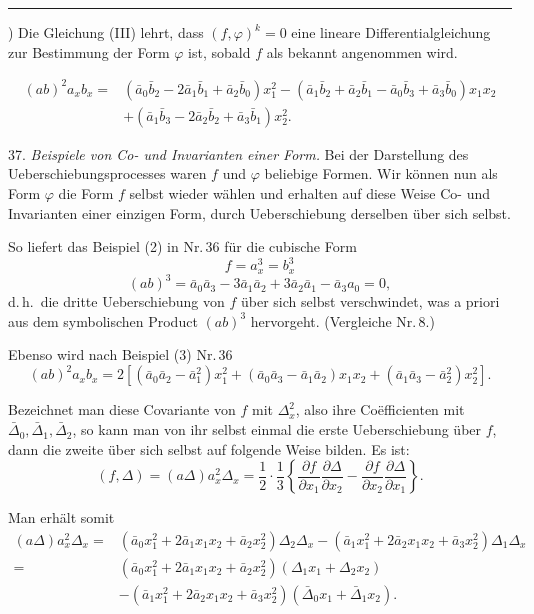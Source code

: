 \documentclass[11pt]{article}
\providecommand{\weberpage}[1]{}
\providecommand{\weq}[2]{\begin{equation}\tag{#1}#2\end{equation}}
\let\Delta\varDelta
\begin{document}
\noindent\rule{4cm}{0.4pt}

{\footnotesize *) Die Gleichung (III) lehrt, dass $(f, \varphi)^k = 0$ eine lineare
Differentialgleichung zur Bestimmung der Form $\varphi$ ist, sobald $f$ als bekannt
angenommen wird.}


\weberpage{38}
\weq{3}{
\begin{aligned}
(ab)^2a_xb_x={}&(\bar a_0\bar b_2-2\bar a_1\bar b_1+\bar a_2\bar b_0)x_1^2 - (\bar a_1\bar b_2+\bar a_2\bar b_1-\bar a_0\bar b_3+\bar a_3\bar b_0)x_1x_2\\
&+(\bar a_1\bar b_3-2\bar a_2\bar b_2+\bar a_3\bar b_1)x_2^2.
\end{aligned}
}

37. \textit{Beispiele von Co- und Invarianten einer Form.} Bei der
Darstellung des Ueberschiebungsprocesses waren $f$ und $\varphi$
beliebige Formen. Wir können nun als Form $\varphi$ die Form $f$
selbst wieder wählen und erhalten auf diese Weise Co- und Invarianten
einer einzigen Form, durch Ueberschiebung derselben über sich selbst.

So liefert das Beispiel (2) in Nr.\,36 für die cubische Form
\[
f=a_x^3=b_x^3
\]
\[
(ab)^3=\bar a_0\bar a_3-3\bar a_1\bar a_2+3\bar a_2\bar a_1-\bar a_3a_0=0,
\]
d.\,h.\ die dritte Ueberschiebung von $f$ über sich selbst verschwindet,
was a priori aus dem symbolischen Product $(ab)^3$ hervorgeht. (Vergleiche
Nr.\,8.)

Ebenso wird nach Beispiel (3) Nr.\,36
\weq{4}{(ab)^2a_xb_x=2\left[(\bar a_0\bar a_2-\bar a_1^2)x_1^2+(\bar a_0\bar a_3-\bar a_1\bar a_2)x_1x_2+(\bar a_1\bar a_3-\bar a_2^2)x_2^2\right].}

Bezeichnet man diese Covariante von $f$ mit $\Delta_x^2$, also ihre
Co\"efficienten mit $\bar\Delta_0, \bar\Delta_1, \bar\Delta_2$, so kann man von
ihr selbst einmal die erste Ueberschiebung über $f$, dann die zweite über
sich selbst auf folgende Weise bilden. Es ist:
\[
(f, \Delta)=(a\Delta)a_x^2\Delta_x=\frac{1}{2}\cdot\frac{1}{3}\left\{\frac{\partial f}{\partial x_1}\frac{\partial \Delta}{\partial x_2} - \frac{\partial f}{\partial x_2}\frac{\partial \Delta}{\partial x_1}\right\}.
\]

Man erhält somit
\[
\begin{aligned}
(a\Delta)a_x^2\Delta_x={}&(\bar a_0x_1^2+2\bar a_1x_1x_2+\bar a_2x_2^2)\Delta_2\Delta_x-(\bar a_1x_1^2+2\bar a_2x_1x_2+\bar a_3x_2^2)\Delta_1\Delta_x\\
={}&(\bar a_0x_1^2+2\bar a_1x_1x_2+\bar a_2x_2^2)(\Delta_1x_1+\Delta_2x_2)\\
&-(\bar a_1x_1^2+2\bar a_2x_1x_2+\bar a_3x_2^2)(\bar\Delta_0x_1+\bar\Delta_1x_2).
\end{aligned}
\]
\end{document}

